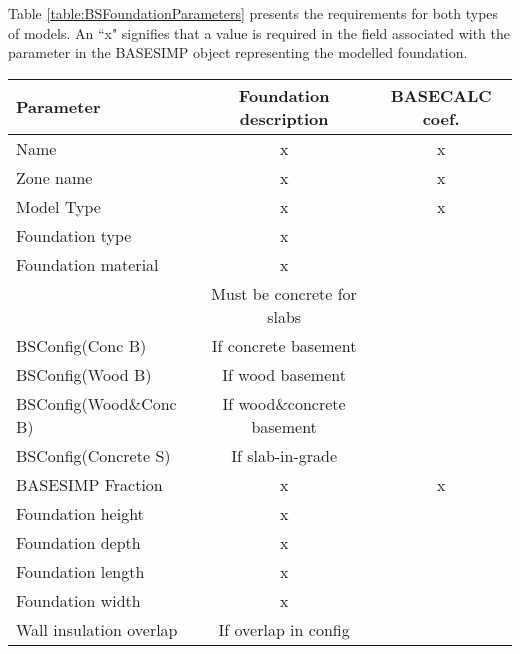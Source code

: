 Table \ref{table:BSFoundationParameters} presents the requirements for both types of models.  An ``x" signifies that a value is required in the field associated with the parameter in the BASESIMP object representing the modelled foundation.

\begin{longtable}{lcc}
\hline
\textbf{Parameter }             & \textbf{Foundation description}   & \textbf{BASECALC coef.}     \\
\hline
\hline
Name                            & x                                 & x                         \\
Zone name                       & x                                 & x                         \\
Model Type                      & x                                 & x                         \\
Foundation type                 & x                                 &                           \\
Foundation material             & x                                 &                           \\
                                & Must be concrete for slabs        &                           \\
BSConfig(Conc B)                & If concrete basement              &                           \\
BSConfig(Wood B)                & If wood basement                  &                           \\
BSConfig(Wood\&Conc B)          & If wood\&concrete basement     &                           \\
BSConfig(Concrete S)            & If slab-in-grade                  &                           \\
BASESIMP Fraction               & x                                 & x                         \\
Foundation height               & x                                 &                           \\
Foundation depth                & x                                 &                           \\
Foundation length               & x                                 &                           \\
Foundation width                & x                                 &                           \\
Wall insulation overlap         & If overlap in config              &                           \\

\end{longtable}
